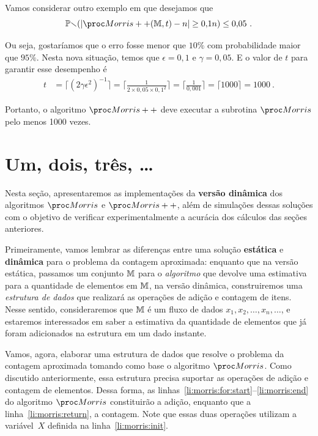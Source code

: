 Vamos considerar outro exemplo em que desejamos que
\[ \Pbb(|\Morrispp(\Mbb, t) - n| \geq 0{,}1n) \leq 0{,}05 \ . \]

Ou seja, gostaríamos que o erro fosse menor que $10\%$ com probabilidade maior que $95\%$. Nesta nova situação, temos 
que $\epsilon = 0{,}1$ e $\gamma = 0{,}05$. E o valor de $t$ para garantir esse desempenho é
\begin{align}
  t &= \lceil (2\gamma\epsilon^2)^{-1}\rceil = \bigg\lceil \frac{1}{2 \times 0{,}05 \times 0,1^2}\bigg\rceil = 
  \bigg\lceil \frac{1}{0{,}001} \bigg\rceil = \lceil 1000 \rceil = 1000 \ . \label{morris:plus:expected_result} 
\end{align}

Portanto, o algoritmo $\Morrispp$ deve executar a subrotina $\Morris$ pelo menos 1000 vezes.

\section{Um, dois, três, \dots}
\label{chap:morris:experiments}

Nesta seção, apresentaremos as implementações da \textbf{versão dinâmica} dos algoritmos $\Morris$ e $\Morrispp$, além
de simulações dessas soluções com o objetivo de verificar experimentalmente a acurácia dos cálculos das seções 
anteriores.

Primeiramente, vamos lembrar as diferenças entre uma solução \textbf{estática} e \textbf{dinâmica} para o problema da 
contagem aproximada: enquanto que na versão estática, passamos um conjunto $\mathbb{M}$ para o \textit{algoritmo} que devolve 
uma estimativa para a quantidade de elementos em $\mathbb{M}$, na versão dinâmica, construiremos uma 
\textit{estrutura de dados} que realizará as operações de adição e contagem de itens. Nesse sentido, consideraremos 
que $\mathbb{M}$ é um fluxo de dados $x_1, x_2, \dots, x_n, \dots$, e estaremos interessados em saber a estimativa da 
quantidade de elementos que já foram adicionados na estrutura em um dado instante.

Vamos, agora, elaborar uma estrutura de dados que resolve o problema da contagem aproximada tomando como base o 
algoritmo $\Morris$. Como discutido anteriormente, essa estrutura precisa suportar as operações de adição e contagem de 
elementos. Dessa forma, as linhas~\ref{li:morris:for:start}--\ref{li:morris:end} do algoritmo $\Morris$ constituirão a 
adição, enquanto que a linha~\ref{li:morris:return}, a contagem. Note que essas duas operações utilizam a variável~$X$ 
definida na linha~\ref{li:morris:init}.

